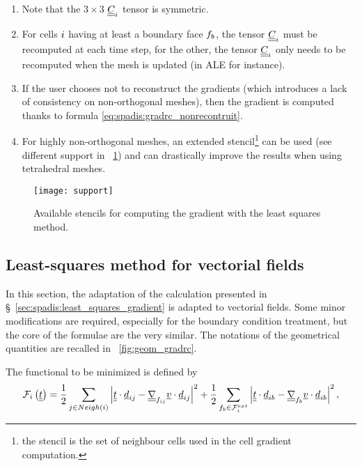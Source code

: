 \begin{remark}
\begin{enumerate}[ label=\roman{*}/, ref=(\roman{*})]
\item Note that the $3\times3$ $\underline{\underline{C}}_i$ tensor is symmetric.
\item For cells $i$ having at least a boundary face ${f_{b}}$, the tensor $\underline{\underline{C}}_i$ must be recomputed at each time step,
for the other, the tensor $\underline{\underline{C}}_i$ only needs to be recomputed when the mesh is updated (in ALE for instance).
\item If the user chooses not to reconstruct the gradients (which introduces a lack of consistency on non-orthogonal meshes),
then the gradient is computed thanks to formula \eqref{eq:spadis:gradrc_nonrecontruit}.
\item For highly non-orthogonal meshes, an extended stencil\footnote{
the stencil is the set of neighbour cells used in the cell gradient computation.
} can be used (see different support in \figurename~\ref{fig:spadis:gradmc_support}) and can drastically improve the results when using tetrahedral meshes.
\end{enumerate}
\end{remark}

\begin{figure}[!htp]
\centerline{\texttt{[image: support]}}
\caption{Available stencils for computing the gradient with the least squares method.\label{fig:spadis:gradmc_support}}
\end{figure}


\subsection{Least-squares method for vectorial fields}\label{sec:spadis:least_squares_gradient_vectors}
%
In this section, the adaptation of the calculation presented in \S~\ref{sec:spadis:least_squares_gradient} is adapted to
vectorial fields. Some minor modifications are required, especially for the boundary condition treatment, but the core of the
formulae are the very similar. The notations of the geometrical quantities are recalled in \figurename~\ref{fig:geom_gradrc}.

The functional to be minimized is defined by
%
\begin{equation}\label{eq:spadis:gradmv_function}
\mathcal{F}_i
\left( \underline{\underline{t}} \right) =
\dfrac{1}{2}\sum\limits_{j \in Neigh\left(i\right)  }
\left| 
 \underline{\underline{t}}   \cdot \underline{d}_{ij}  -  \underline{\underline{\nabla}}_{{f_{ij}}} \underline{v}   \cdot \underline{d}_{ij}
 \right|^2+
\dfrac{1}{2}\sum\limits_{ {f_{b}} \in \mathcal{F}^{ext}_{i}}
\left| 
 \underline{\underline{t}}   \cdot \underline{d}_{ib}  -  \underline{\underline{\nabla}}_{{f_{b}}} \underline{v}   \cdot \underline{d}_{ib}
 \right|^2,
\end{equation}

